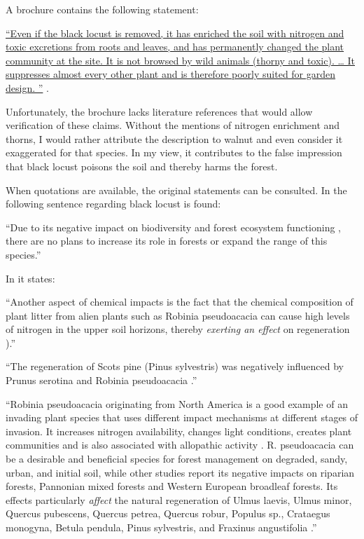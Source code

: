 A brochure contains the following statement:

\hyperlink{german:oebf2019aliensAusDemGarten}{\enquote{Even if the black locust is removed, it has enriched the soil with nitrogen and toxic excretions from roots and leaves, and has permanently changed the plant community at the site. It is not browsed by wild animals (thorny and toxic). \dots
  It suppresses almost every other plant and is therefore poorly suited for garden design.%
}} \citep[own translation]{oebf2019aliensAusDemGarten}.

Unfortunately, the brochure lacks literature references that would allow verification
of these claims. Without the mentions of nitrogen enrichment and thorns,
I would rather attribute the description to walnut and even consider it exaggerated for that species.
In my view, it contributes to the false impression that black locust poisons the soil
and thereby harms the forest.

When quotations are available, the original statements can be consulted.
In \citet{szyp2023robinieGenetik} the following sentence regarding black locust is found:

\enquote{Due to its negative impact on biodiversity and forest
  ecosystem functioning \citep{langmaier2020alienPlants}, there are no
  plans to increase its role in forests or expand the range of this
  species.}

In \citep{langmaier2020alienPlants} it states:

\enquote{Another aspect of chemical impacts is the fact that the
  chemical composition of plant litter from alien plants such as
  Robinia pseudoacacia can cause high levels of nitrogen in the upper
  soil horizons, thereby \emph{exerting an effect} on regeneration
  \citep{rahmonov2009robinieLitter}).}

\enquote{The regeneration of Scots pine (Pinus sylvestris) was
  negatively influenced by Prunus serotina and Robinia pseudoacacia
  \citep{sebert2007invasive,rahmonov2009robinieLitter}.}

\enquote{Robinia pseudoacacia originating from North America is a good
  example of an invading plant species that uses different impact
  mechanisms at different stages of invasion. It increases nitrogen
  availability, changes light conditions, creates plant communities
  and is also associated with allopathic activity
  \citep{rahmonov2009robinieLitter,campagnaro2018alien}.
  R. pseudoacacia can be a desirable and beneficial species for forest
  management on degraded, sandy, urban, and initial soil, while other
  studies report its negative impacts on riparian forests, Pannonian
  mixed forests and Western European broadleaf forests. Its effects
  particularly \emph{affect} the natural regeneration of Ulmus laevis,
  Ulmus minor, Quercus pubescens, Quercus petrea, Quercus robur,
  Populus sp., Crataegus monogyna, Betula pendula, Pinus sylvestris,
  and Fraxinus angustifolia
  \citep{rahmonov2009robinieLitter,maringer2012robinePostFire,petrasova2013neophyten,radtke2013robinieNiederwald,terwei2013nonNative}.}

